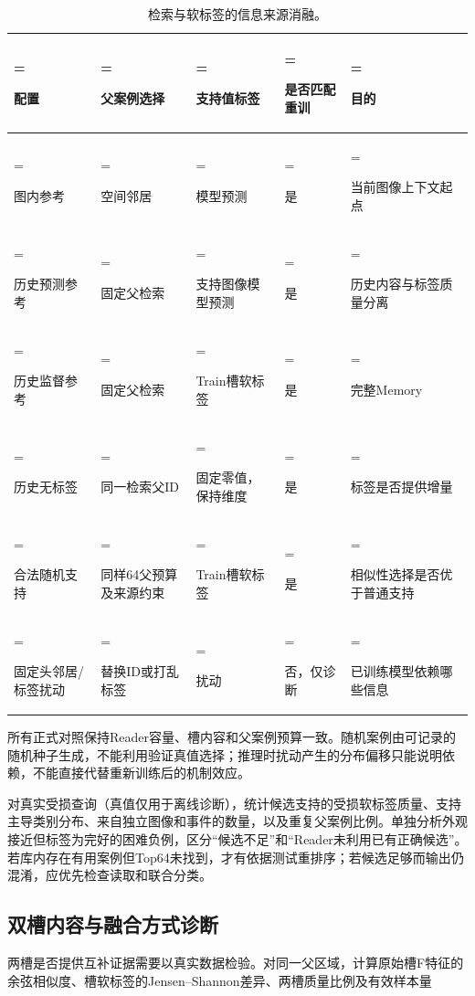 \documentclass[UTF8,a4paper,zihao=-4,fontset=none]{ctexart}
\begin{document}
\begin{table}[!htbp]
\centering
\renewcommand{\thetable}{4}
\caption{检索与软标签的信息来源消融。}
\label{tab:4}
\small
\setlength{\tabcolsep}{3.5pt}
\renewcommand{\arraystretch}{1.3}
\begin{tabularx}{\linewidth}{@{}>{\hsize=1.100000\hsize\linewidth=\hsize\raggedright\arraybackslash}X>{\hsize=1.000000\hsize\linewidth=\hsize\raggedright\arraybackslash}X>{\hsize=1.000000\hsize\linewidth=\hsize\raggedright\arraybackslash}X>{\hsize=0.700000\hsize\linewidth=\hsize\raggedright\arraybackslash}X>{\hsize=1.200000\hsize\linewidth=\hsize\raggedright\arraybackslash}X@{}}
\toprule
\textbf{配置} & \textbf{父案例选择} & \textbf{支持值标签} & \textbf{是否匹配重训} & \textbf{目的} \\
\midrule
图内参考 & 空间邻居 & 模型预测 & 是 & 当前图像上下文起点 \\
历史预测参考 & 固定父检索 & 支持图像模型预测 & 是 & 历史内容与标签质量分离 \\
历史监督参考 & 固定父检索 & Train槽软标签 & 是 & 完整Memory \\
历史无标签 & 同一检索父ID & 固定零值，保持维度 & 是 & 标签是否提供增量 \\
合法随机支持 & 同样64父预算及来源约束 & Train槽软标签 & 是 & 相似性选择是否优于普通支持 \\
固定头邻居/标签扰动 & 替换ID或打乱标签 & 扰动 & 否，仅诊断 & 已训练模型依赖哪些信息 \\
\bottomrule
\end{tabularx}
\end{table}

所有正式对照保持Reader容量、槽内容和父案例预算一致。随机案例由可记录的随机种子生成，不能利用验证真值选择；推理时扰动产生的分布偏移只能说明依赖，不能直接代替重新训练后的机制效应。

对真实受损查询（真值仅用于离线诊断），统计候选支持的受损软标签质量、支持主导类别分布、来自独立图像和事件的数量，以及重复父案例比例。单独分析外观接近但标签为完好的困难负例，区分``候选不足''和``Reader未利用已有正确候选''。若库内存在有用案例但Top64未找到，才有依据测试重排序；若候选足够而输出仍混淆，应优先检查读取和联合分类。

\FloatBarrier

\subsection{双槽内容与融合方式诊断}

两槽是否提供互补证据需要以真实数据检验。对同一父区域，计算原始槽F特征的余弦相似度、槽软标签的Jensen--Shannon差异、两槽质量比例及有效样本量
\end{document}
